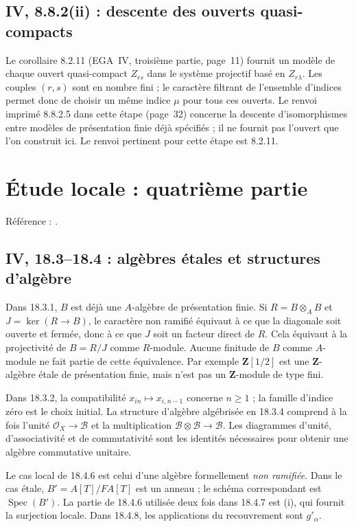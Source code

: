 \documentclass[11pt,a4paper]{article}
\begin{document}
\subsection{IV, 8.8.2(ii) : descente des ouverts quasi-compacts}
Le corollaire 8.2.11 (EGA~IV, troisième partie, page~11) fournit
un modèle de chaque ouvert quasi-compact $Z_{rs}$ dans le système
projectif basé en $Z_{r\lambda}$. Les couples $(r,s)$ sont en nombre
fini ; le caractère filtrant de l'ensemble d'indices permet donc
de choisir un même indice $\mu$ pour tous ces ouverts.
Le renvoi imprimé 8.8.2.5 dans cette étape (page~32) concerne la
descente d'isomorphismes entre modèles de présentation finie déjà
spécifiés ; il ne fournit pas l'ouvert que l'on construit ici.
Le renvoi pertinent pour cette étape est 8.2.11.

\section{Étude locale : quatrième partie}
\label{part:iv4}
Référence : \cite{EGAIV4}.
\subsection{IV, 18.3--18.4 : algèbres étales et structures d’algèbre}
\label{note:iv4-unramified}
Dans 18.3.1, $B$ est déjà une $A$-algèbre de présentation finie.
Si $R=B\otimes_A B$ et $J=\ker(R\to B)$, le caractère non ramifié
équivaut à ce que la diagonale soit ouverte et fermée, donc à ce que
$J$ soit un facteur direct de $R$. Cela équivaut à la projectivité
de $B=R/J$ comme $R$-module. Aucune finitude de $B$ comme $A$-module
ne fait partie de cette équivalence. Par exemple $\mathbf Z[1/2]$
est une $\mathbf Z$-algèbre étale de présentation finie, mais n'est
pas un $\mathbf Z$-module de type fini.

Dans 18.3.2, la compatibilité $x_{in}\mapsto x_{i,n-1}$ concerne
$n\geq1$ ; la famille d'indice zéro est le choix initial.
La structure d'algèbre algébrisée en 18.3.4 comprend à la fois
l'unité $\mathcal O_X\to\mathcal B$ et la multiplication
$\mathcal B\otimes\mathcal B\to\mathcal B$. Les diagrammes d'unité,
d'associativité et de commutativité sont les identités nécessaires
pour obtenir une algèbre commutative unitaire.

Le cas local de 18.4.6 est celui d'une algèbre formellement
\emph{non ramifiée}. Dans le cas étale, $B'=A[T]/FA[T]$ est un
anneau ; le schéma correspondant est $\operatorname{Spec}(B')$.
La partie de 18.4.6 utilisée deux fois dans 18.4.7 est (i), qui fournit
la surjection locale. Dans 18.4.8, les applications du recouvrement
sont $g'_\alpha$.
\end{document}
